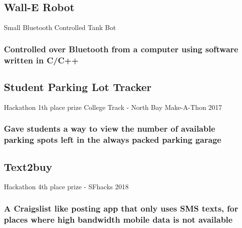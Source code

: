 \documentclass{article}
\begin{document}
	\subsection{Wall-E Robot}Small Bluetooth Controlled Tank Bot
    	\vspace{-3mm}
		\subsubsection{Controlled over Bluetooth from a computer using software written in C/C++}
		
	\subsection{Student Parking Lot Tracker} Hackathon 1th place prize College Track - North Bay Make-A-Thon 2017
    	\vspace{-3mm}
		\subsubsection{Gave students a way to view the number of available parking spots left in the always packed parking garage}
		
	\subsection{Text2buy} Hackathon 4th place prize - SFhacks 2018
    	\vspace{-3mm}
		\subsubsection{A Craigslist  like posting app that only uses SMS texts, for places where high bandwidth mobile data is not available}
		
\end{document}
